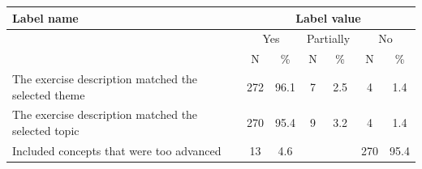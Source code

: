 \begin{tabularx}{\textwidth}{Xcccccc}
    \toprule
    Label name & \multicolumn{6}{c}{Label value} \\
    \midrule
    & \multicolumn{2}{c}{Yes} 
    & \multicolumn{2}{c}{Partially} 
    & \multicolumn{2}{c}{No} \\
     & N & \% & N & \% & N & \% \\
    \midrule
    The exercise description matched the selected theme 
    & 272 & 96.1 & 7 & 2.5 & 4 & 1.4 \\
    The exercise description matched the selected topic 
    & 270 & 95.4 & 9 & 3.2 & 4 & 1.4 \\
    Included concepts that were too advanced 
    & 13 & 4.6 & {} & {} & 270 & 95.4 \\
    \bottomrule
\end{tabularx}